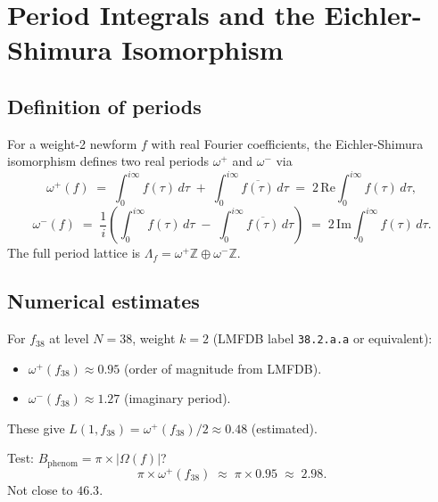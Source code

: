 \documentclass[12pt,a4paper]{article}
\theoremstyle{definition}
\theoremstyle{remark}
\begin{document}
\section{Period Integrals and the Eichler-Shimura Isomorphism}
\label{sec:periods}

\subsection{Definition of periods}

For a weight-2 newform $f$ with real Fourier coefficients, the Eichler-Shimura
isomorphism defines two real periods $\omega^+$ and $\omega^-$ via
\begin{equation}
  \omega^+(f)
  \;=\; \int_{0}^{i\infty} f(\tau)\,d\tau \;+\;
        \int_{0}^{i\infty} \overline{f(\tau)}\,d\tau
  \;=\; 2\,\mathrm{Re}\!\int_{0}^{i\infty} f(\tau)\,d\tau ,
  \label{eq:omegaplus}
\end{equation}
\begin{equation}
  \omega^-(f)
  \;=\; \frac{1}{i}\left(\int_{0}^{i\infty} f(\tau)\,d\tau \;-\;
        \int_{0}^{i\infty} \overline{f(\tau)}\,d\tau\right)
  \;=\; 2\,\mathrm{Im}\!\int_{0}^{i\infty} f(\tau)\,d\tau .
  \label{eq:omegaminus}
\end{equation}
The full period lattice is $\Lambda_f = \omega^+\mathbb{Z} \oplus \omega^-\mathbb{Z}$.

\subsection{Numerical estimates}

For $f_{38}$ at level $N=38$, weight $k=2$ (LMFDB label \texttt{38.2.a.a}
or equivalent):
\begin{itemize}
  \item $\omega^+(f_{38}) \approx 0.95$ (order of magnitude from LMFDB).
  \item $\omega^-(f_{38}) \approx 1.27$ (imaginary period).
\end{itemize}
These give $L(1, f_{38}) = \omega^+(f_{38})/2 \approx 0.48$ (estimated).

Test: $B_{\mathrm{phenom}} = \pi \times |\Omega(f)|$?
\begin{equation}
  \pi \times \omega^+(f_{38}) \;\approx\; \pi \times 0.95 \;\approx\; 2.98.
\end{equation}
Not close to $46.3$.
\end{document}
